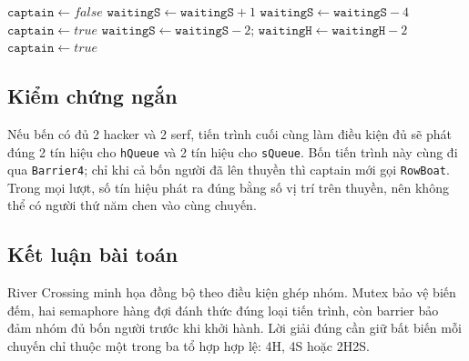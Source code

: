 \begin{algorithmic}[1]
    \State {} 
    \State {}
    \State {}
        \State {}
        \State {} 
    \EndIf
\EndProcedure

    \State $\texttt{captain} \gets false$
    \State {}
    \State $\texttt{waitingS} \gets \texttt{waitingS} + 1$
            \State {}
        \EndFor
        \State $\texttt{waitingS} \gets \texttt{waitingS} - 4$
        \State $\texttt{captain} \gets true$
            \State {}
            \State {}
        \EndFor
        \State $\texttt{waitingS} \gets \texttt{waitingS} - 2$; $\texttt{waitingH} \gets \texttt{waitingH} - 2$
        \State $\texttt{captain} \gets true$
    \Else
        \State {} 
    \EndIf

    \State {}
    \State {}
    \State {}
        \State {}
        \State {} 
    \EndIf
\EndProcedure
\end{algorithmic}

\subsection{Kiểm chứng ngắn}

Nếu bến có đủ 2 hacker và 2 serf, tiến trình cuối cùng làm điều kiện đủ sẽ phát đúng 2 tín hiệu cho \texttt{hQueue} và 2 tín hiệu cho \texttt{sQueue}. Bốn tiến trình này cùng đi qua \texttt{Barrier4}; chỉ khi cả bốn người đã lên thuyền thì captain mới gọi \texttt{RowBoat}. Trong mọi lượt, số tín hiệu phát ra đúng bằng số vị trí trên thuyền, nên không thể có người thứ năm chen vào cùng chuyến.

\subsection{Kết luận bài toán}

River Crossing minh họa đồng bộ theo điều kiện ghép nhóm. Mutex bảo vệ biến đếm, hai semaphore hàng đợi đánh thức đúng loại tiến trình, còn barrier bảo đảm nhóm đủ bốn người trước khi khởi hành. Lời giải đúng cần giữ bất biến mỗi chuyến chỉ thuộc một trong ba tổ hợp hợp lệ: 4H, 4S hoặc 2H2S.

